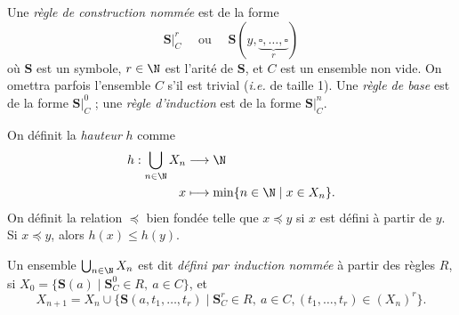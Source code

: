 \begin{multicols}{2}
\begin{recap-box}
	\end{recap-box}
	\vfill
	\vfill
	\begin{recap-box}
		Une \textit{règle de construction nommée} est de la forme \[
			\mathbf{S}\Big|_C^r \quad\text{ ou }\quad \mathbf{S}(y, \underbrace{\square, \ldots, \square}_r)
		\] où $\mathbf{S}$\/ est un symbole, $r \in \N$\/ est l'arité de $\mathbf{S}$, et $C$\/ est un ensemble non vide.
		On omettra parfois l'ensemble $C$\/ s'il est trivial (\textit{i.e.} de taille 1).
		Une \textit{règle de base} est de la forme $\mathbf{S}\big|^0_C$\/ ; une \textit{règle d'induction} est de la forme $\mathbf{S}\big|^n_C$.
	\end{recap-box}
	\vfill
	\begin{recap-box}
		On définit la \textit{hauteur} $h$\/ comme \begin{align*}
			h: \bigcup_{n \in \N} X_n &\longrightarrow \N \\
			x &\longmapsto \min \{n \in \N  \mid  x \in X_n\}.
		\end{align*}
		On définit la relation $\preceq$\/ bien fondée telle que $x \preceq y$\/ si $x$\/ est défini à partir de $y$. Si $x \preceq y$, alors $h(x) \le h(y)$.
	\end{recap-box}
	\vfill
\end{multicols}
\begin{recap-box}
	Un ensemble $\bigcup_{n \in \N} X_n$\/ est dit \textit{défini par induction nommée} à partir des règles $R$, si $X_0 = \{\mathbf{S}(a) \mid  \mathbf{S}^0_C \in R,\:a \in C\}$, et \[
		X_{n+1} = X_n \cup \{\mathbf{S}(a, t_1, \ldots, t_r) \mid \mathbf{S}^r_C \in R,\:a \in C, (t_1, \ldots, t_r) \in (X_n)^r\} 
	.\]
\end{recap-box}

